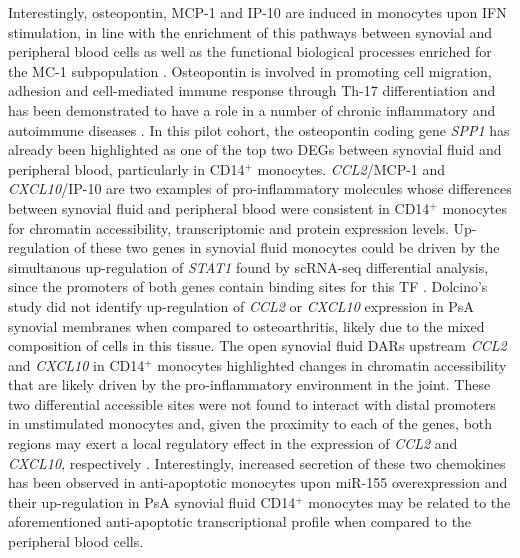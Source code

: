 Interestingly, osteopontin, MCP-1 and IP-10 are induced in monocytes upon IFN stimulation, in line with the enrichment of this pathways between synovial and peripheral blood cells as well as the functional biological processes enriched for the MC-1 subpopulation \parencite{Li2003,Kopydlowski1999}. Osteopontin is involved in promoting cell migration, adhesion and cell-mediated immune response through Th-17 differentiation and has been demonstrated to have a role in a number of chronic inflammatory and autoimmune diseases \parencite{Morimoto2010,Rittling2015}. In this pilot cohort, the osteopontin coding gene \textit{SPP1} has already been highlighted as one of the top two DEGs between synovial fluid and peripheral blood, particularly in CD14$^+$ monocytes. \textit{CCL2}/MCP-1 and \textit{CXCL10}/IP-10 are two examples of pro-inflammatory molecules whose differences between synovial fluid and peripheral blood were consistent in CD14$^+$ monocytes for chromatin accessibility, transcriptomic and protein expression levels. Up-regulation of these two genes in synovial fluid monocytes could be driven by the simultanous up-regulation of \textit{STAT1} found by scRNA-seq differential analysis, since the promoters of both genes contain binding sites for this TF \parencite{Rauch2013}. Dolcino's study did not identify up-regulation of \textit{CCL2} or \textit{CXCL10} expression in PsA synovial membranes when compared to osteoarthritis, likely due to the mixed composition of cells in this tissue. The open synovial fluid DARs upstream \textit{CCL2} and \textit{CXCL10} in CD14$^+$ monocytes highlighted changes in chromatin accessibility that are likely driven by the pro-inflammatory environment in the joint. These two differential accessible sites were not found to interact with distal promoters in unstimulated monocytes and, given the proximity to each of the genes, both regions may exert a local regulatory effect in the expression of \textit{CCL2} and \textit{CXCL10}, respectively \parencite{Javierre2016}. Interestingly, increased secretion of these two chemokines has been observed in anti-apoptotic monocytes upon miR-155 overexpression and their up-regulation in PsA synovial fluid CD14$^+$ monocytes may be related to the aforementioned anti-apoptotic transcriptional profile when compared to the peripheral blood cells.  

